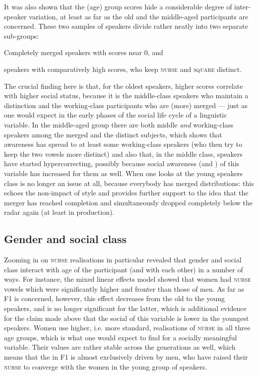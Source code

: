 It was also shown that the (age) group  scores hide a considerable degree of inter-speaker variation, at least as far as the old and the middle-aged participants are concerned.
These two samples of speakers divide rather neatly into two separate sub-groups:
\begin{inparaenum}[(1)]
	\item Completely merged speakers with  scores near 0, and
	\item speakers with comparatively high  scores, who keep \textsc{nurse} and \textsc{square} distinct.
\end{inparaenum}
The crucial finding here is that, for the oldest speakers, higher  scores correlate with higher social status, because it is the middle-class speakers who maintain a distinction and the working-class participants who are (more) merged --- just as one would expect in the early phases of the social life cycle of a linguistic variable.
In the middle-aged group there are both middle \emph{and} working-class speakers among the merged and the distinct subjects, which shows that awareness has spread to at least some working-class speakers (who then try to keep the two vowels more distinct) and also that, in the middle class, speakers have started hypercorrecting, possibly because social awareness (and ) of this variable has increased for them as well.
When one looks at the young speakers class is no longer an issue at all, because everybody has merged distributions: this echoes the non-impact of style and provides further support to the idea that the merger has reached completion and simultaneously dropped completely below the radar again (at least in production).

\subsection{Gender and social class}
\label{prod.disc.nurse.social}

Zooming in on \textsc{nurse} realisations in particular revealed that gender and social class interact with age of the participant (and with each other) in a number of ways.
For instance, the mixed linear effects model showed that women had \textsc{nurse} vowels which were significantly higher and fronter than those of men.
As far as F1 is concerned, however, this effect decreases from the old to the young speakers, and is no longer significant for the latter, which is additional evidence for the claim made above that the social  of this variable is lower in the youngest speakers.
Women use higher, i.e. more standard, realisations of \textsc{nurse} in all three age groups, which is what one would expect to find for a socially meaningful variable.
Their values are rather stable across the generations as well, which means that the   in F1 is almost exclusively driven by men, who have raised their \textsc{nurse} to converge with the women in the young group of speakers.

